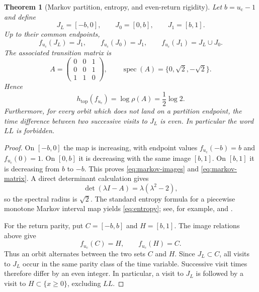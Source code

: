 \documentclass[11pt]{article}
\newtheorem{theorem}{Theorem}[section]
\theoremstyle{definition}
\theoremstyle{remark}
\newcommand{\uc}{u_{\mathrm c}}
\begin{document}
\begin{theorem}[Markov partition, entropy, and even-return rigidity]\label{thm:markov}
Let $b=\uc-1$ and define
\[
    J_L=[-b,0],\qquad J_0=[0,b],\qquad J_1=[b,1].
\]
Up to their common endpoints,
\begin{equation}\label{eq:markov-images}
    f_{\uc}(J_L)=J_1,\qquad
    f_{\uc}(J_0)=J_1,\qquad
    f_{\uc}(J_1)=J_L\cup J_0.
\end{equation}
The associated transition matrix is
\begin{equation}\label{eq:markov-matrix}
    A=
    \begin{pmatrix}
        0&0&1\\
        0&0&1\\
        1&1&0
    \end{pmatrix},
    \qquad \operatorname{spec}(A)=\{0,\sqrt2,-\sqrt2\}.
\end{equation}
Hence
\begin{equation}\label{eq:entropy}
    h_{\mathrm{top}}(f_{\uc})=\log\rho(A)=\frac12\log2.
\end{equation}
Furthermore, for every orbit which does not land on a partition endpoint, the time difference between two successive visits to $J_L$ is even.  In particular the word $LL$ is forbidden.
\end{theorem}

\begin{proof}
On $[-b,0]$ the map is increasing, with endpoint values $f_{\uc}(-b)=b$ and $f_{\uc}(0)=1$.  On $[0,b]$ it is decreasing with the same image $[b,1]$.  On $[b,1]$ it is decreasing from $b$ to $-b$.  This proves \eqref{eq:markov-images} and \eqref{eq:markov-matrix}.  A direct determinant calculation gives
\[
    \det(\lambda I-A)=\lambda(\lambda^2-2),
\]
so the spectral radius is $\sqrt2$.  The standard entropy formula for a piecewise monotone Markov interval map yields \eqref{eq:entropy}; see, for example, \citet{deMeloVanStrien1993} and \citet[Ch.~4]{LindMarcus1995}.

For the return parity, put $C=[-b,b]$ and $H=[b,1]$.  The image relations above give
\[
    f_{\uc}(C)=H,\qquad f_{\uc}(H)=C.
\]
Thus an orbit alternates between the two sets $C$ and $H$.  Since $J_L\subset C$, all visits to $J_L$ occur in the same parity class of the time variable.  Successive visit times therefore differ by an even integer.  In particular, a visit to $J_L$ is followed by a visit to $H\subset\{x\ge0\}$, excluding $LL$.
\end{proof}
\end{document}
